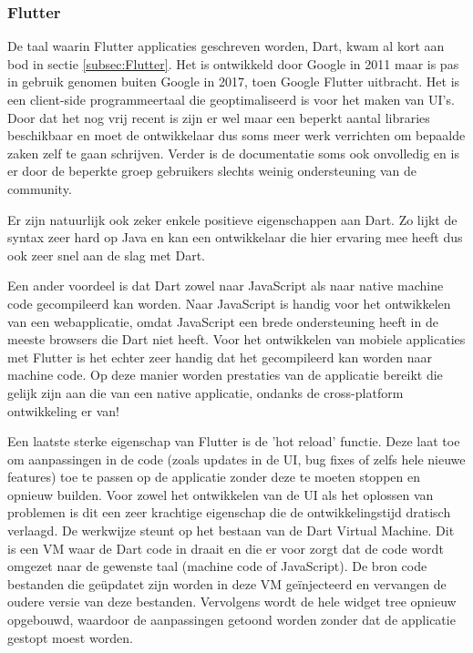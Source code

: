 \subsubsection{Flutter}
\label{subsubsec:taalFlutter}

De taal waarin Flutter applicaties geschreven worden, Dart, kwam al kort aan bod in sectie \ref{subsec:Flutter}. Het is ontwikkeld door Google in 2011 maar is pas in gebruik genomen buiten Google in 2017, toen Google Flutter uitbracht. Het is een client-side programmeertaal die geoptimaliseerd is voor het maken van UI's. Door dat het nog vrij recent is zijn er wel maar een beperkt aantal libraries beschikbaar en moet de ontwikkelaar dus soms meer werk verrichten om bepaalde zaken zelf te gaan schrijven. Verder is de documentatie soms ook onvolledig en is er door de beperkte groep gebruikers slechts weinig ondersteuning van de community.

Er zijn natuurlijk ook zeker enkele positieve eigenschappen aan Dart. Zo lijkt de syntax zeer hard op Java en kan een ontwikkelaar die hier ervaring mee heeft dus ook zeer snel aan de slag met Dart. 

Een ander voordeel is dat Dart zowel naar JavaScript als naar native machine code gecompileerd kan worden. Naar JavaScript is handig voor het ontwikkelen van een webapplicatie, omdat JavaScript een brede ondersteuning heeft in de meeste browsers die Dart niet heeft. Voor het ontwikkelen van mobiele applicaties met Flutter is het echter zeer handig dat het gecompileerd kan worden naar machine code. Op deze manier worden prestaties van de applicatie bereikt die gelijk zijn aan die van een native applicatie, ondanks de cross-platform ontwikkeling er van!

Een laatste sterke eigenschap van Flutter is de 'hot reload' functie. Deze laat toe om aanpassingen in de code (zoals updates in de UI, bug fixes of zelfs hele nieuwe features) toe te passen op de applicatie zonder deze te moeten stoppen en opnieuw builden. Voor zowel het ontwikkelen van de UI als het oplossen van problemen is dit een zeer krachtige eigenschap die de ontwikkelingstijd dratisch verlaagd. De werkwijze steunt op het bestaan van de Dart Virtual Machine. Dit is een VM waar de Dart code in draait en die er voor zorgt dat de code wordt omgezet naar de gewenste taal (machine code of JavaScript). De bron code bestanden die geüpdatet zijn worden in deze VM geïnjecteerd en vervangen de oudere versie van deze bestanden. Vervolgens wordt de hele widget tree opnieuw opgebouwd, waardoor de aanpassingen getoond worden zonder dat de applicatie gestopt moest worden.


